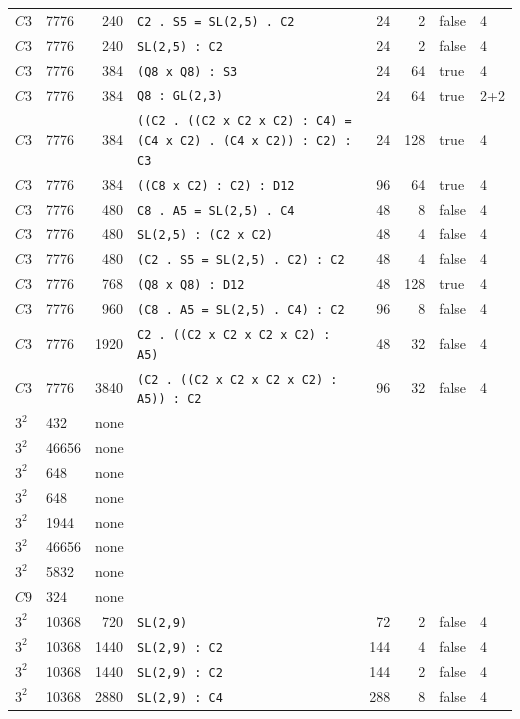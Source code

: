 \begin{longtable}{llrlrrll}
$C3$ & 7776 & 240 & \texttt{C2 . S5 = SL(2,5) . C2} & 24 & 2 & false & 4\\
$C3$ & 7776 & 240 & \texttt{SL(2,5) : C2} & 24 & 2 & false & 4\\
$C3$ & 7776 & 384 & \texttt{(Q8 x Q8) : S3} & 24 & 64 & true & 4\\
$C3$ & 7776 & 384 & \texttt{Q8 : GL(2,3)} & 24 & 64 & true & 2+2\\
$C3$ & 7776 & 384 & \texttt{((C2 . ((C2 x C2 x C2) : C4) = (C4 x C2) . (C4 x C2)) : C2) : C3} & 24 & 128 & true & 4\\
$C3$ & 7776 & 384 & \texttt{((C8 x C2) : C2) : D12} & 96 & 64 & true & 4\\
$C3$ & 7776 & 480 & \texttt{C8 . A5 = SL(2,5) . C4} & 48 & 8 & false & 4\\
$C3$ & 7776 & 480 & \texttt{SL(2,5) : (C2 x C2)} & 48 & 4 & false & 4\\
$C3$ & 7776 & 480 & \texttt{(C2 . S5 = SL(2,5) . C2) : C2} & 48 & 4 & false & 4\\
$C3$ & 7776 & 768 & \texttt{(Q8 x Q8) : D12} & 48 & 128 & true & 4\\
$C3$ & 7776 & 960 & \texttt{(C8 . A5 = SL(2,5) . C4) : C2} & 96 & 8 & false & 4\\
$C3$ & 7776 & 1920 & \texttt{C2 . ((C2 x C2 x C2 x C2) : A5)} & 48 & 32 & false & 4\\
$C3$ & 7776 & 3840 & \texttt{(C2 . ((C2 x C2 x C2 x C2) : A5)) : C2} & 96 & 32 & false & 4\\
$3^2$ & 432 & \multicolumn{6}{l}{none}\\
$3^2$ & 46656 & \multicolumn{6}{l}{none}\\
$3^2$ & 648 & \multicolumn{6}{l}{none}\\
$3^2$ & 648 & \multicolumn{6}{l}{none}\\
$3^2$ & 1944 & \multicolumn{6}{l}{none}\\
$3^2$ & 46656 & \multicolumn{6}{l}{none}\\
$3^2$ & 5832 & \multicolumn{6}{l}{none}\\
$C9$ & 324 & \multicolumn{6}{l}{none}\\
$3^2$ & 10368 & 720 & \texttt{SL(2,9)} & 72 & 2 & false & 4\\
$3^2$ & 10368 & 1440 & \texttt{SL(2,9) : C2} & 144 & 4 & false & 4\\
$3^2$ & 10368 & 1440 & \texttt{SL(2,9) : C2} & 144 & 2 & false & 4\\
$3^2$ & 10368 & 2880 & \texttt{SL(2,9) : C4} & 288 & 8 & false & 4\\

\end{longtable}
